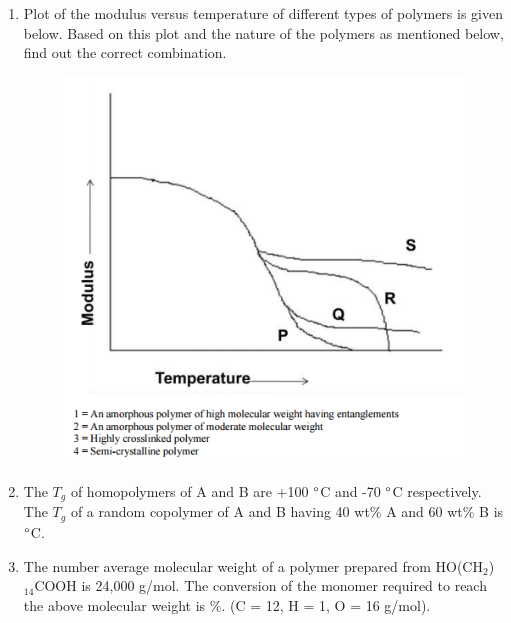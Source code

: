 \documentclass[a4paper,10pt]{article}
\begin{document}
\begin{enumerate}
    \item Plot of the modulus versus temperature of different types of polymers is given below. Based on this plot and the nature of the polymers as mentioned below, find out the correct combination.
    \begin{figure}[H] \centering \includegraphics[width=0.7\columnwidth]{q17_poly_2018.png} \caption*{} \label{fig:q17_poly_2018} \end{figure}
    \hfill{}
    \begin{enumerate}[label=\Alph*)]
    \end{enumerate}

    \item The $T_g$ of homopolymers of A and B are +100 $\degree$C and -70 $\degree$C respectively. The $T_g$ of a random copolymer of A and B having 40 wt\% A and 60 wt\% B is \underline{\hspace{2cm}} $\degree$C.
    \hfill{}

    \item The number average molecular weight of a polymer prepared from HO(CH$_2$)$_{14}$COOH is 24,000 g/mol. The conversion of the monomer required to reach the above molecular weight is \underline{\hspace{2cm}} \%. (C = 12, H = 1, O = 16 g/mol).
    \hfill{}


\end{enumerate}
\end{document}

